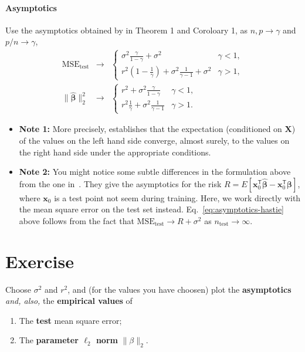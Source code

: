 \documentclass[a4paper,10pt]{article}
\newcommand{\trnsp}{\mathsf{T}}
\newenvironment{note}
{
\begin{center}
\begin{lrbox}{\mybox}
\begin{minipage}{42em}}
{\end{minipage}
\end{lrbox}\fbox{\usebox{\mybox}}
\end{center}}
\begin{document}
    \paragraph{Asymptotics} Use the asymptotics obtained by \citet{hastie_surprises_2019} in Theorem 1 and Coroloary 1, as $n, p\rightarrow \gamma$ and $p / n\rightarrow \gamma$,
    \begin{eqnarray}
        \label{eq:asymptotics-hastie}
        \text{MSE}_{\text{test}}  &\rightarrow&
        \begin{cases}
        \sigma^2 \frac{\gamma}{1 - \gamma} + \sigma^2& \gamma < 1, \\
        r^2 (1 - \frac{1}{\gamma}) + \sigma^2 \frac{1}{\gamma - 1}+ \sigma^2 & \gamma > 1,
        \end{cases}\\
        \|\hat{\boldsymbol{\beta}}\|_2^2 &\rightarrow&
        \begin{cases}
        r^2 + \sigma^2 \frac{\gamma}{1 - \gamma} & \gamma < 1, \\
        r^2 \frac{1}{\gamma} + \sigma^2 \frac{1}{\gamma - 1} &  \gamma > 1.
        \end{cases}
    \end{eqnarray}
    \begin{note}
    \begin{itemize}
    \item \textbf{Note 1:}
    More precisely, \citet{hastie_surprises_2019} establishes that the expectation (conditioned on $\textbf{X}$) of the values on the left hand side converge, almost surely, to the values on the right hand side  under the appropriate conditions.
    \item \textbf{Note 2:}
    You might notice some subtle differences in the formulation above from the one in~\citet{hastie_surprises_2019}. They give the asymptotics for the risk $R = E[\textbf{x}_0^\trnsp\hat{\boldsymbol{\beta}} -  \textbf{x}_0^\trnsp\boldsymbol{\beta}]$, where $\textbf{x}_0$ is a test point not seem during training. Here, we work directly with the mean square error on the test set instead.  Eq.~\ref{eq:asymptotics-hastie} above follows from the fact that $\text{MSE}_{\text{test}}\rightarrow R + \sigma^2$ as $n_{\text{test}} \rightarrow \infty$.
    \end{itemize}
    \end{note}
\section*{Exercise}
Choose $\sigma^2$ and $r^2$, and  (for the values you have choosen) plot the \textbf{asymptotics} \textit{and, also,} the \textbf{empirical values} of
\begin{enumerate}
    \item The \textbf{test} mean square error;
    \item  The \textbf{parameter $\ell_2$ norm} $\|\beta\|_2$.
\end{enumerate}
\end{document}
